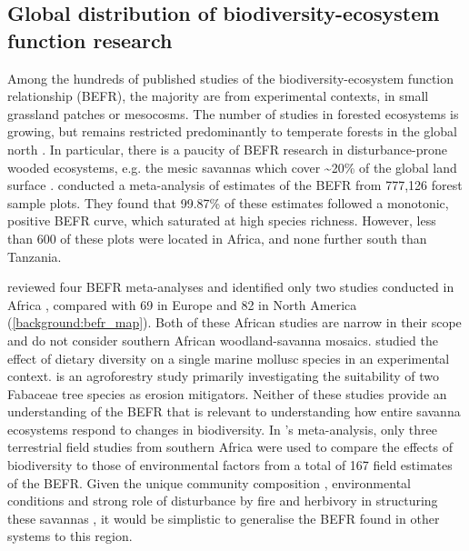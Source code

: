 \begin{refsection}
\subsection{Global distribution of biodiversity-ecosystem function research}
\label{background:ssec:befr_global}

Among the hundreds of published studies of the biodiversity-ecosystem function relationship (BEFR), the majority are from experimental contexts, in small grassland patches or mesocosms. The number of studies in forested ecosystems is growing, but remains restricted predominantly to temperate forests in the global north \citep{Clarke2017}. In particular, there is a paucity of BEFR research in disturbance-prone wooded ecosystems, e.g. the mesic savannas which cover \textasciitilde{}20\% of the global land surface \citep{Scholes1993}. \citet{Liang2016} conducted a meta-analysis of estimates of the BEFR from 777,126 forest sample plots. They found that 99.87\% of these estimates followed a monotonic, positive BEFR curve, which saturated at high species richness. However, less than 600 of these plots were located in Africa, and none further south than Tanzania. 

\citet{Clarke2017} reviewed four BEFR meta-analyses \citep{Gamfeldt2015, Griffin2013a, Zhang2012, Cardinale2009} and identified only two studies conducted in Africa \citep{Foster1999, Burleigh1997}, compared with 69 in Europe and 82 in North America (\autoref{background:befr_map}). Both of these African studies are narrow in their scope and do not consider southern African woodland-savanna mosaics. \citet{Foster1999} studied the effect of dietary diversity on a single marine mollusc species in an experimental context. \citet{Burleigh1997} is an agroforestry study primarily investigating the suitability of two Fabaceae tree species as erosion mitigators. Neither of these studies provide an understanding of the BEFR that is relevant to understanding how entire savanna ecosystems respond to changes in biodiversity. In \citeauthor{Duffy2017}'s \citeyearpar{Duffy2017} meta-analysis, only three terrestrial field studies from southern Africa were used to compare the effects of biodiversity to those of environmental factors from a total of 167 field estimates of the BEFR. Given the unique community composition \citep{Lehmann2011}, environmental conditions \citep{Linder2003} and strong role of disturbance by fire and herbivory in structuring these savannas \citep{Staver2011}, it would be simplistic to generalise the BEFR found in other systems to this region.


\end{refsection}
